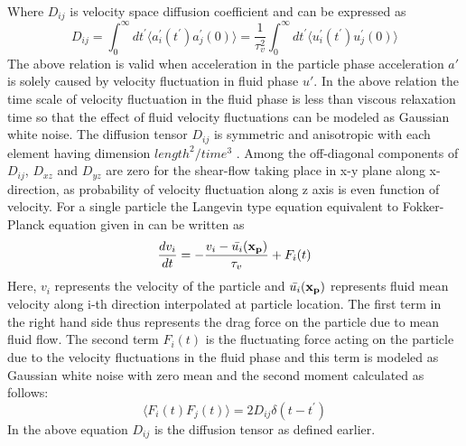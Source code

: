 \documentclass[notitlepage]{revtex4-1}
\begin{document}
Where $D_{ij}$ is velocity space diffusion coefficient and can be expressed as 
\begin{equation}
	\label{eq2.4}
	D_{ij}=\int_{0}^{\infty}dt^{'}\langle a_i^{'}(t^{'})a_j^{'}(0)\rangle=\frac{1}{\tau_v^2}\int_{0}^{\infty}dt^{'}\langle u_i^{'}(t^{'})u_j^{'}(0)\rangle
\end{equation}
The above relation is valid when acceleration in the particle phase acceleration $a'$ is solely caused by velocity fluctuation in fluid phase $u'$. In the above relation the time scale of velocity fluctuation in the fluid phase is less than viscous relaxation time so that the effect of fluid velocity fluctuations can be modeled as Gaussian white noise. The diffusion tensor $D_{ij}$ is symmetric and anisotropic with each element having dimension $length^2/time^3$ . Among the off-diagonal components of $D_{ij}$, $D_{xz}$ and $D_{yz}$ are zero for the shear-flow taking place in x-y plane along x-direction, as probability of velocity fluctuation along z axis is even function of velocity. For a single particle the Langevin type equation equivalent to Fokker-Planck equation given in \citep{goswami2010particle} can be written as
\begin{equation}
	\label{eq2.5}
	\frac{dv_i}{dt}=-\frac{v_i-\bar{u_i}(\bf{x}_p)}{\tau_v}+F_i(t)
\end{equation}
Here, $v_i$ represents the velocity of the particle and $\bar{u_i}(\bf{x}_p)$ represents fluid mean velocity along i-th direction interpolated at particle location. The first term in the right hand side thus represents the drag force on the particle due to mean fluid flow. The second term $F_i(t)$  is the fluctuating force acting on the particle due to the velocity fluctuations in the fluid phase and this term is modeled as Gaussian white noise with zero mean and the second moment calculated as follows:
\begin{equation}
	\label{eq2.6}
	\langle F_i(t)F_j(t)\rangle=2D_{ij}\delta(t-t^{\prime})
\end{equation}
In the above equation $D_{ij}$ is the diffusion tensor as defined earlier.
\end{document}
